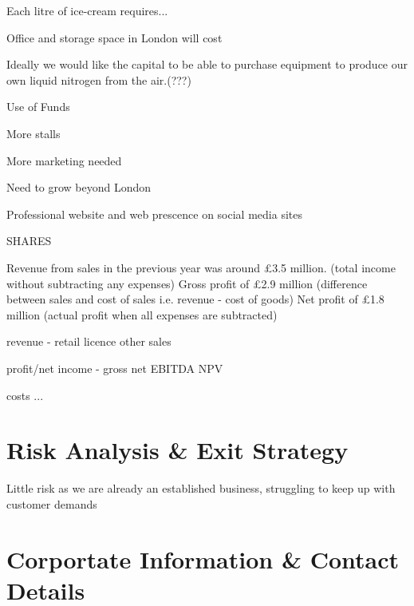\documentclass{article}
\begin{document}
Each litre of ice-cream requires...

Office and storage space in London will cost

Ideally we would like the capital to be able to purchase equipment to
produce our own liquid nitrogen from the air.(???)

Use of Funds

More stalls

More marketing needed

Need to grow beyond London

Professional website and web prescence on social media sites


SHARES

Revenue from sales in the previous year was around £3.5 million. (total income without subtracting any expenses) 
Gross profit of £2.9 million (difference between sales and cost of sales i.e. revenue - cost of goods)
Net profit of £1.8 million (actual profit when all expenses are subtracted)



revenue
 - retail
   licence
   other sales

profit/net income
 - gross
   net
   EBITDA
   NPV

costs
 ...

\section{Risk Analysis \& Exit Strategy}

Little risk as we are already an established business, struggling to keep up with customer demands



\section{Corportate Information \& Contact Details}
\end{document}
